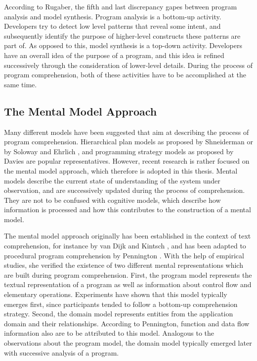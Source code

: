 According to Rugaber, the fifth and last discrepancy gapes between program analysis and model synthesis.
Program analysis is a bottom-up activity.
Developers try to detect low level patterns that reveal some intent, and subsequently identify the purpose of higher-level constructs these patterns are part of.
As opposed to this, model synthesis is a top-down activity.
Developers have an overall idea of the purpose of a program, and this idea is refined successively through the consideration of lower-level details.
During the process of program comprehension, both of these activities have to be accomplished at the same time.

\subsection{The Mental Model Approach}
\label{ss:BackgroundComprehensionMentalModel}
Many different models have been suggested that aim at describing the process of program comprehension.
Hierarchical plan models as proposed by Shneiderman \cite{shneiderman_exploratory_1976} or by Soloway and Ehrlich \cite{soloway_empirical_1984}, and programming strategy models as proposed by Davies \cite{davies_role_1991} are popular representatives.
However, recent research is rather focused on the mental model approach, which therefore is adopted in this thesis.
Mental models describe the current state of understanding of the system under observation, and are successively updated during the process of comprehension.
They are not to be confused with cognitive models, which describe how information is processed and how this contributes to the construction of a mental model.

The mental model approach originally has been established in the context of text comprehension, for instance by van Dijk and Kintsch \cite{van_dijk_strategies_1983}, and has been adapted to procedural program comprehension by Pennington \cite{pennington_comprehension_1987, pennington_stimulus_1987}.
With the help of empirical studies, she verified the existence of two different mental representations which are built during program comprehension.
First, the program model represents the textual representation of a program as well as information about control flow and elementary operations.
Experiments have shown that this model typically emerges first, since participants tended to follow a bottom-up comprehension strategy.
Second, the domain model represents entities from the application domain and their relationships.
According to Pennington, function and data flow information also are to be attributed to this model.
Analogous to the observations about the program model, the domain model typically emerged later with successive analysis of a program.

